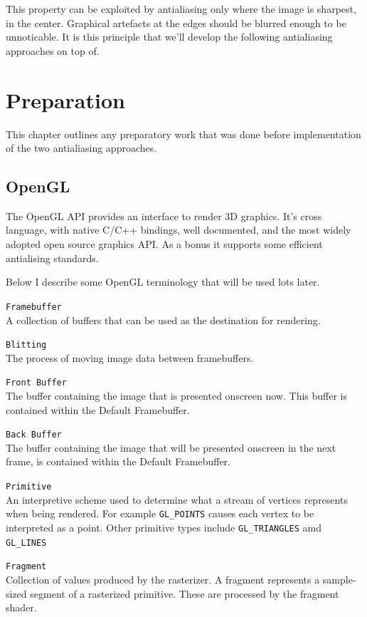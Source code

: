 \documentclass[12pt,a4paper,twoside,openright]{report}
\begin{document}
This property can be exploited by antialiasing only where the image is sharpest, in the center. Graphical artefacts at the edges should be blurred enough to be unnoticable. It is this principle that we'll develop the following antialiasing approaches on top of.

\chapter{Preparation}

This chapter outlines any preparatory work that was done before implementation of the two antialiasing approaches.

\section{OpenGL}

The OpenGL API provides an interface to render 3D graphics. It's cross language, with native C/C++ bindings, well documented, and the most widely adopted open source graphics API. As a bonus it supports some efficient antialising standards.

Below I describe some OpenGL terminology that will be used lots later.

\begin{description}

\item\texttt{Framebuffer} \\
  A collection of buffers that can be used as the destination for rendering.

\item\texttt{Blitting} \\
  The process of moving image data between framebuffers.

\item\texttt{Front Buffer} \\
  The buffer containing the image that is presented onscreen now. This buffer is contained within the Default Framebuffer.

\item\texttt{Back Buffer} \\
  The buffer containing the image that will be presented onscreen in the next frame, is contained within the Default Framebuffer. 

\item\texttt{Primitive} \\
  An interpretive scheme used to determine what a stream of vertices represents when being rendered. For example \texttt{GL\_POINTS} causes each vertex to be interpreted as a point. Other primitive types include \texttt{GL\_TRIANGLES} amd \texttt{GL\_LINES}
\item\texttt{Fragment} \\
  Collection of values produced by the rasterizer. A fragment represents a sample-sized segment of a rasterized primitive. These are processed by the fragment shader. 
\end{description}
\end{document}
